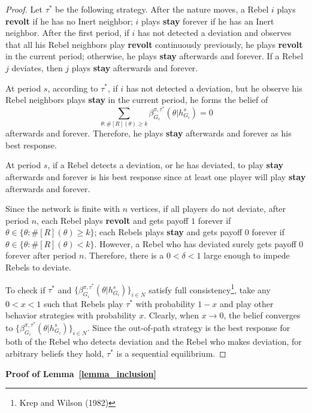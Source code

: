 \documentclass[12pt,letter]{article}
\newtheorem*{lemma*}{Lemma}
\theoremstyle{definition}
\theoremstyle{remark}
\theoremstyle{claim}
\begin{document}
\begin{proof}
Let $\tau^{*}$ be the following strategy. After the nature moves, a Rebel $i$ plays \textbf{revolt} if he has no Inert neighbor; $i$ plays \textbf{stay} forever if he has an Inert neighbor. After the first period, if $i$ has not detected a deviation and observes that all his Rebel neighbors play \textbf{revolt} continuously previously, he plays \textbf{revolt} in the current period; otherwise, he plays \textbf{stay} afterwards and forever. If a Rebel $j$ deviates, then $j$ plays \textbf{stay} afterwards and forever.

At period $s$, according to $\tau^{*}$, if $i$ has not detected a deviation, but he observe his Rebel neighbors plays \textbf{stay} in the current period, he forms the belief of \[\sum_{\theta:\#[R](\theta)\geq k}\beta^{\pi,\tau^*}_{G_i}(\theta|h^{s}_{G_i})=0\] afterwards and forever. Therefore, he plays \textbf{stay} afterwards and forever as his best response. 

At period $s$, if a Rebel detects a deviation, or he has deviated, to play \textbf{stay} afterwards and forever is his best response since at least one player will play \textbf{stay} afterwards and forever. 

Since the network is finite with $n$ vertices, if all players do not deviate, after period $n$, each Rebel plays \textbf{revolt} and gets payoff $1$ forever if $\theta\in \{\theta: \#[R](\theta)\geq k\}$; each Rebels plays \textbf{stay} and gets payoff $0$ forever if $\theta\in \{\theta: \#[R](\theta)< k\}$. However, a Rebel who has deviated surely gets payoff $0$ forever after period $n$. Therefore, there is a $0<\delta<1$ large enough to impede Rebels to deviate.

To check if $\tau^{*}$ and $\{\beta^{\pi,\tau^*}_{G_i}(\theta|h^{s}_{G_i})\}_{i\in N}$ satisfy full consistency\footnote{Krep and Wilson (1982)}, take any $0<x<1$ such that Rebels play $\tau^{*}$ with probability $1-x$ and play other behavior strategies with probability $x$. Clearly, when $x \rightarrow 0$, the belief converges to $\{\beta^{\pi,\tau^*}_{G_i}(\theta|h^{s}_{G_i})\}_{i\in N}$. Since the out-of-path strategy is the best response for both of the Rebel who detects deviation and the Rebel who makes deviation, for arbitrary beliefs they hold, $\tau^{*}$ is a sequential equilibrium.
\end{proof}
%
%
\bigskip
\noindent\textbf{Proof of Lemma~\ref{lemma_inclusion}}
\end{document}
